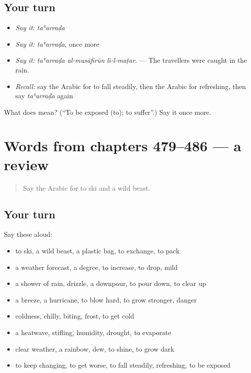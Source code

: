 \subsection*{Your turn}
\begin{itemize}
\raggedright
  \item \emph{Say it:} \emph{taʿarraḍa}
  \item \emph{Say it:} \emph{taʿarraḍa}, once more
  \item \emph{Say it:} \emph{taʿarraḍa al-musāfirūn li-l-maṭar.} — The travellers were caught in the rain.
  \item \emph{Recall:} say the Arabic for to fall steadily, then the Arabic for refreshing, then say \emph{taʿarraḍa} again
\end{itemize}

\begin{tcolorbox}[breakable,colback=teal!4,colframe=teal!35!black,title={Before you move on}]
What does  mean? (\textquotedblleft{}To be exposed (to); to suffer\textquotedblright{}.) Say it once more.
\end{tcolorbox}
\section[(dialogue)]{Words from chapters 479–486 — a review}

\label{lesson:AR-R486-review-479-486}



\begin{quote}
Say the Arabic for to ski and a wild beast.
\end{quote}

\subsection*{Your turn}
Say these aloud:

\begin{itemize}
\raggedright
  \item to ski, a wild beast, a plastic bag, to exchange, to pack
  \item a weather forecast, a degree, to increase, to drop, mild
  \item a shower of rain, drizzle, a downpour, to pour down, to clear up
  \item a breeze, a hurricane, to blow hard, to grow stronger, danger
  \item coldness, chilly, biting, frost, to get cold
  \item a heatwave, stifling, humidity, drought, to evaporate
  \item clear weather, a rainbow, dew, to shine, to grow dark
  \item to keep changing, to get worse, to fall steadily, refreshing, to be exposed
\end{itemize}

